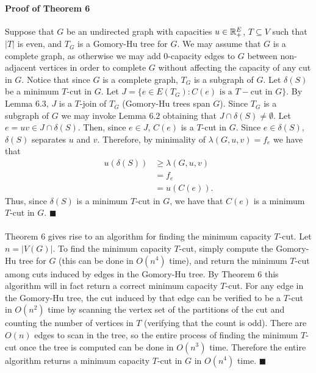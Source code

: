 \documentclass[letterpaper,12pt,oneside,onecolumn]{article}
\begin{document}
\paragraph{Proof of Theorem 6}
Suppose that $G$ be an undirected graph with capacities $u \in \mathbb{R}_+^E$, $T\subseteq V$ such that $|T|$ is even, and $T_G$ is a Gomory-Hu tree for $G$. We may assume that $G$ is a complete graph, as otherwise we may add $0$-capacity edges to $G$ between non-adjacent vertices in order to complete $G$ without affecting the capacity of any cut in $G$. Notice that since $G$ is a complete graph, $T_G$ is a subgraph of $G$. Let $\delta(S)$ be a minimum $T$-cut in $G$. Let $J  = \{e \in E(T_G) : C(e) \text{ is a } T-\text{cut in } G\}$. By Lemma $6.3$, $J$ is a $T$-join of $T_G$ (Gomory-Hu trees span $G$). Since $T_G$ is a subgraph of $G$ we may invoke Lemma $6.2$ obtaining that $J \cap \delta(S) \neq \emptyset$. Let $e=uv \in J \cap \delta(S)$. Then, since $e \in J$, $C(e)$ is a $T$-cut in $G$. Since $e \in \delta(S)$, $\delta(S)$ separates $u$ and $v$. Therefore, by minimality of $\lambda(G, u,v) = f_e$ we have that
\begin{align*}
u(\delta(S)) &\geq \lambda(G,u,v) \\
&= f_e \\
&= u(C(e)).
\end{align*}
Thus, since $\delta(S)$ is a minimum $T$-cut in $G$, we have that $C(e)$ is a minimum $T$-cut in $G$. $\blacksquare$
\paragraph{}
Theorem $6$ gives rise to an algorithm for finding the minimum capacity $T$-cut. Let $n = |V(G)|$. To find the minimum capacity $T$-cut, simply compute the Gomory-Hu tree for $G$ (this can be done in $O(n^4)$ time), and return the minimum $T$-cut among cuts induced by edges in the Gomory-Hu tree. By Theorem $6$ this algorithm will in fact return a correct minimum capacity $T$-cut. For any edge in the Gomory-Hu tree, the cut induced by that edge can be verified to be a $T$-cut in $O(n^2)$ time by scanning the vertex set of the partitions of the cut and counting the number of vertices in $T$ (verifying that the count is odd). There are $O(n)$ edges to scan in the tree, so the entire process of finding the minimum $T$-cut once the tree is computed can be done in $O(n^3)$ time. Therefore the entire algorithm returns a minimum capacity $T$-cut in $G$ in $O(n^4)$ time. $\blacksquare$
\end{document}
